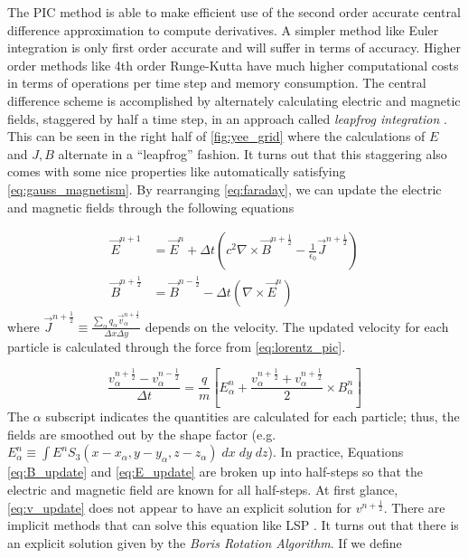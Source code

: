 The \gls{PIC} method is able to make efficient use of the second order accurate central difference approximation to compute derivatives. A simpler method like Euler integration is only first order accurate and will suffer in terms of accuracy. Higher order methods like 4th order Runge-Kutta have much higher computational costs in terms of operations per time step and memory consumption. The central difference scheme is accomplished by alternately calculating electric and magnetic fields, staggered by half a time step, in an approach called \emph{leapfrog integration} \cite{Birdsall_2004_PIC}. This can be seen in the right half of \autoref{fig:yee_grid} where the calculations of $E$ and $J,B$ alternate in a ``leapfrog'' fashion. It turns out that this staggering also comes with some nice properties like automatically satisfying \autoref{eq:gauss_magnetism}. By rearranging \autoref{eq:faraday}, we can update the electric and magnetic fields through the following equations \cite{Arber_2015_PPCF}

\begin{align}
	\vec{E}^{n+1} &= \vec{E}^{n} + \Delta t (c^2 \nabla \times \vec{B}^{n+\frac{1}{2}} - \frac{1}{\epsilon_0} \vec{J}^{n+\frac{1}{2}}) \label{eq:E_update} \\
	\vec{B}^{n+\frac{1}{2}} &= \vec{B}^{n-\frac{1}{2}} - \Delta t (\nabla \times \vec{E}^{n}) \label{eq:B_update}
\end{align}
where $\vec{J}^{n+\frac{1}{2}} \equiv \frac{\sum_\alpha q_\alpha \vec{v}^{n+\frac{1}{2}}_\alpha}{\Delta x \Delta y}$ depends on the velocity. The updated velocity for each particle is calculated through the force from \autoref{eq:lorentz_pic}. 

\begin{equation}
	\frac{v^{n + \frac{1}{2}}_\alpha - v^{n - \frac{1}{2}}_\alpha}{\Delta t} = \frac{q}{m}[E^n_\alpha + \frac{v^{n + \frac{1}{2}}_\alpha + v^{n + \frac{1}{2}}_\alpha}{2} \times B^n_\alpha] \label{eq:v_update}
\end{equation}
The $\alpha$ subscript indicates the quantities are calculated for each particle; thus, the fields are smoothed out by the shape factor (e.g. $E^n_\alpha \equiv \int E^n S_3(x-x_\alpha, y-y_\alpha, z-z_\alpha) \; dx \; dy \; dz$). In practice, Equations \eqref{eq:B_update} and \eqref{eq:E_update} are broken up into half-steps so that the electric and magnetic field are known for all half-steps. At first glance, \autoref{eq:v_update} does not appear to have an explicit solution for $v^{n + \frac{1}{2}}$. There are implicit methods that can solve this equation like \gls{LSP} \cite{Welch_2004_LSP}. It turns out that there is an explicit solution given by the \emph{Boris Rotation Algorithm}. If we define 

